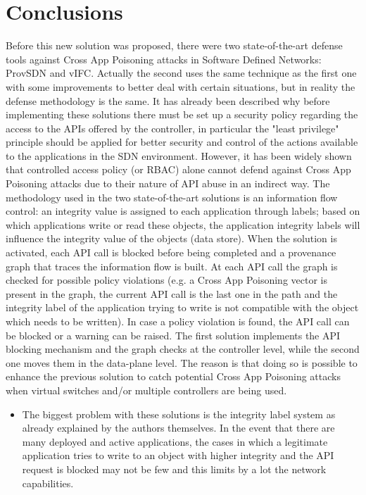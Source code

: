 \documentclass[a4paper,10pt]{memoir}
\begin{document}
{\section{Conclusions}
Before this new solution was proposed, there were two state-of-the-art defense tools against Cross App Poisoning attacks in Software Defined Networks: ProvSDN and vIFC. Actually the second uses the same technique as the first one with some improvements to better deal with certain situations, but in reality the defense methodology is the same. It has already been described why before implementing these solutions there must be set up a security policy regarding the access to the APIs offered by the controller, in particular the "least privilege" principle should be applied for better security and control of the actions available to the applications in the SDN environment. However, it has been widely shown that controlled access policy (or RBAC) alone cannot defend against Cross App Poisoning attacks due to their nature of API abuse in an indirect way. The methodology used in the two state-of-the-art solutions is an information flow control: an integrity value is assigned to each application through labels; based on which applications write or read these objects, the application integrity labels will influence the integrity value of the objects (data store). When the solution is activated, each API call is blocked before being completed and a provenance graph that traces the information flow is built. At each API call the graph is checked for possible policy violations (e.g. a Cross App Poisoning vector is present in the graph, the current API call is the last one in the path and the integrity label of the application trying to write is not compatible with the object which needs to be written). In case a policy violation is found, the API call can be blocked or a warning can be raised. The first solution implements the API blocking mechanism and the graph checks at the controller level, while the second one moves them in the data-plane level. The reason is that doing so is possible to enhance the previous solution to catch potential Cross App Poisoning attacks when virtual switches and/or multiple controllers are being used. 
\begin{itemize}
\item The biggest problem with these solutions is the integrity label system as already explained by the authors themselves. In the event that there are many deployed and active applications, the cases in which a legitimate application tries to write to an object with higher integrity and the API request is blocked may not be few and this limits by a lot the network capabilities.

\end{itemize}}
\end{document}
